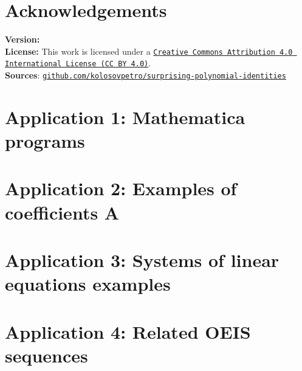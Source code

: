 \documentclass[12pt,letterpaper,oneside,reqno]{amsart}
\begin{document}
    \section*{Acknowledgements}
    

    
    

    \noindent \textbf{Version:} 
    \\[1em]
    \noindent \textbf{License:} This work is licensed under a
    \href{https://creativecommons.org/licenses/by/4.0/}
    {\texttt{Creative Commons Attribution 4.0 International License (CC BY 4.0)}}.
    \\[1em]
    \noindent \textbf{Sources}:
    \href{https://github.com/kolosovpetro/unexpected-polynomial-identities-classical-interpolation}
    {\texttt{github.com/kolosovpetro/surprising-polynomial-identities}}

    \clearpage


    \section*{Application 1: Mathematica programs}
    

    \clearpage


    \section*{Application 2: Examples of coefficients A}
    

    \clearpage


    \section*{Application 3: Systems of linear equations examples}
    

    \clearpage


    \section*{Application 4: Related OEIS sequences}
    
\end{document}
